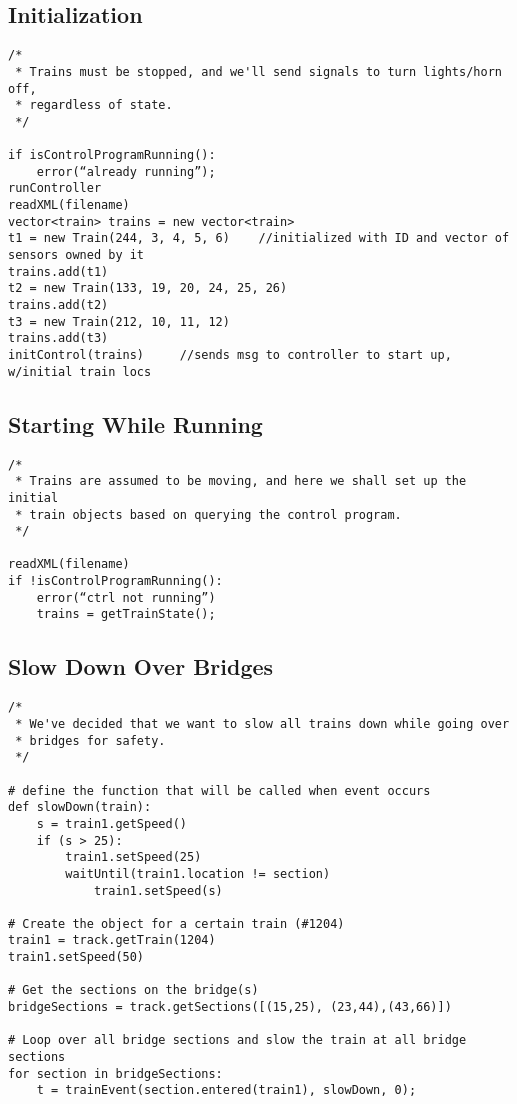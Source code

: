 \documentclass[a4paper,11pt,notitlepage]{article}
\begin{document}
\subsection{Initialization}
\begin{verbatim}
/*
 * Trains must be stopped, and we'll send signals to turn lights/horn off,
 * regardless of state.
 */

if isControlProgramRunning():
    error(“already running”);
runController
readXML(filename)
vector<train> trains = new vector<train>
t1 = new Train(244, 3, 4, 5, 6)    //initialized with ID and vector of sensors owned by it
trains.add(t1)
t2 = new Train(133, 19, 20, 24, 25, 26)
trains.add(t2)
t3 = new Train(212, 10, 11, 12)
trains.add(t3)
initControl(trains)     //sends msg to controller to start up, w/initial train locs
\end{verbatim}

\subsection{Starting While Running}
\begin{verbatim}
/*
 * Trains are assumed to be moving, and here we shall set up the initial 
 * train objects based on querying the control program.
 */

readXML(filename)
if !isControlProgramRunning():
    error(“ctrl not running”)
	trains = getTrainState();
\end{verbatim}

\subsection{Slow Down Over Bridges}
\begin{verbatim}
/*
 * We've decided that we want to slow all trains down while going over
 * bridges for safety.
 */

# define the function that will be called when event occurs
def slowDown(train):
    s = train1.getSpeed()
	if (s > 25):
		train1.setSpeed(25)
		waitUntil(train1.location != section)
		    train1.setSpeed(s)

# Create the object for a certain train (#1204)
train1 = track.getTrain(1204)
train1.setSpeed(50)

# Get the sections on the bridge(s)
bridgeSections = track.getSections([(15,25), (23,44),(43,66)])

# Loop over all bridge sections and slow the train at all bridge sections
for section in bridgeSections:
    t = trainEvent(section.entered(train1), slowDown, 0);
    
\end{verbatim}
\end{document}
